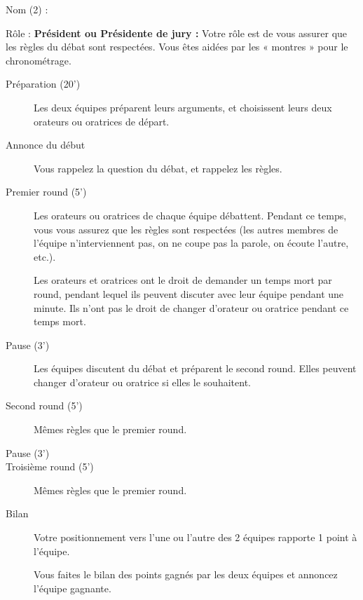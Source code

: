 \documentclass[12pt]{article}
\begin{document}
Nom (2) : \dotfill

\bigskip

Rôle : \textbf{Président ou Présidente de jury :} Votre rôle est de vous assurer que les règles du débat sont respectées. Vous êtes aidées par les « montres » pour le chronométrage. 

\bigskip

\begin{mdframed}
\begin{description}
  \item[Préparation (20')] Les deux équipes préparent leurs arguments, et choisissent leurs deux orateurs ou oratrices de départ.
  \item[Annonce du début] Vous rappelez la question du débat, et rappelez les règles.
  \item[Premier round (5')] Les orateurs ou oratrices de chaque équipe débattent. Pendant ce temps, vous vous assurez que les règles sont respectées (les autres membres de l'équipe n'interviennent pas, on ne coupe pas la parole, on écoute l'autre, etc.).

    Les orateurs et oratrices ont le droit de demander un temps mort par round, pendant lequel ils peuvent discuter avec leur équipe pendant une minute. Ils n'ont pas le droit de changer d'orateur ou oratrice pendant ce temps mort.
  \item[Pause (3')] Les équipes discutent du débat et préparent le second round. Elles peuvent changer d'orateur ou oratrice si elles le souhaitent.
  \item[Second round (5')] Mêmes règles que le premier round.
  \item[Pause (3')]
  \item[Troisième round (5')] Mêmes règles que le premier round.
  \item[Bilan] Votre positionnement vers l'une ou l'autre des 2 équipes rapporte 1 point à l'équipe. 
  
  Vous faites le bilan des points gagnés par les deux équipes et annoncez l'équipe gagnante.
\end{description}
\end{mdframed}
\end{document}
